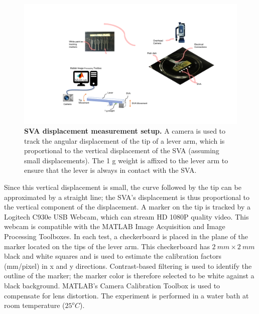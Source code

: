 \begin{figure}[!h]
      \centering
      \includegraphics[width=\textwidth]{swellingTestSetup.pdf}
      \caption[]{\textbf{SVA displacement measurement setup.} A camera is used to track the angular displacement of the tip of a lever arm, which is proportional to the vertical displacement of the SVA (assuming small displacements). The 1 g weight is affixed to the lever arm to ensure that the lever is always in contact with the SVA.}
      \label{fig:swellingTestSetup}
\end{figure}

Since this vertical displacement is small, the curve followed by the tip can be approximated by a straight line; the SVA's displacement is thus proportional to the vertical component of the displacement. A marker on the tip is tracked by a Logitech C930e USB Webcam, which can stream HD 1080P quality video. This webcam is compatible with the MATLAB Image Acquisition and Image Processing Toolboxes. In each test, a checkerboard is placed in the plane of the marker located on the tips of the lever arm. This checkerboard has $2~mm\times2~mm$ black and white squares and is used to estimate the calibration factors (mm/pixel) in x and y directions. Contrast-based filtering is used to identify the outline of the marker; the marker color is therefore selected to be white against a black background. MATLAB’s Camera Calibration Toolbox is used to compensate for lens distortion. The experiment is performed in a water bath at room temperature ($25^{o}C$).



